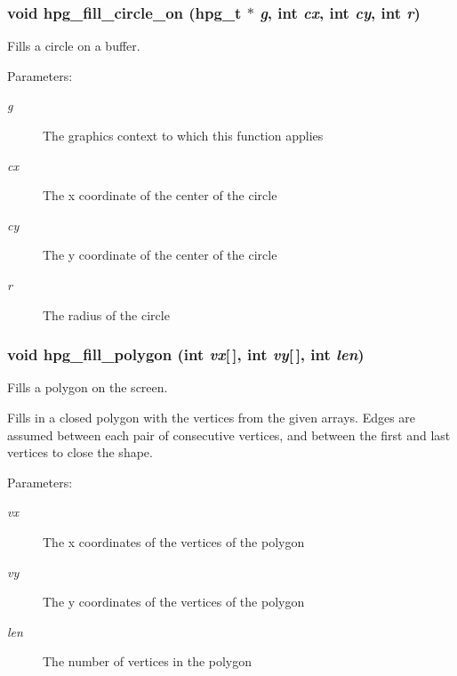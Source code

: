 \subsubsection{\setlength{\rightskip}{0pt plus 5cm}void hpg\_\-fill\_\-circle\_\-on ({\bf hpg\_\-t} $\ast$ {\em g}, int {\em cx}, int {\em cy}, int {\em r})}\label{hpgraphics_8h_a50}


Fills a circle on a buffer.

\begin{Desc}
\item[Parameters: ]\par
\begin{description}
\item[{\em 
g}]The graphics context to which this function applies \item[{\em 
cx}]The x coordinate of the center of the circle \item[{\em 
cy}]The y coordinate of the center of the circle \item[{\em 
r}]The radius of the circle \end{description}
\end{Desc}
\subsubsection{\setlength{\rightskip}{0pt plus 5cm}void hpg\_\-fill\_\-polygon (int {\em vx}[$\,$], int {\em vy}[$\,$], int {\em len})}\label{hpgraphics_8h_a55}


Fills a polygon on the screen.

Fills in a closed polygon with the vertices from the given arrays. Edges are assumed between each pair of consecutive vertices, and between the first and last vertices to close the shape.\begin{Desc}
\item[Parameters: ]\par
\begin{description}
\item[{\em 
vx}]The x coordinates of the vertices of the polygon \item[{\em 
vy}]The y coordinates of the vertices of the polygon \item[{\em 
len}]The number of vertices in the polygon \end{description}
\end{Desc}
